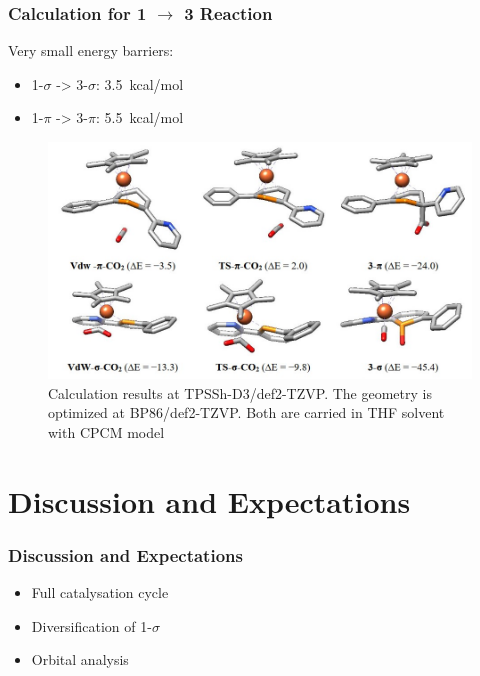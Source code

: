 \documentclass[10pt,aspectratio=43]{beamer}
\numberwithin{equation}{section}
\begin{document}
\begin{frame}
\frametitle{Calculation for 1 $ \rightarrow $ 3 Reaction}
Very small energy barriers:
\begin{itemize}
	\item 1-$ \sigma $ -> 3-$ \sigma $: \SI{3.5}{kcal/mol}
	\item 1-$ \pi $ -> 3-$ \pi $: \SI{5.5}{kcal/mol}
\end{itemize}
\begin{figure}
	\includegraphics[width=0.85\linewidth]{33.jpg}
	\caption{Calculation results at TPSSh-D3/def2-TZVP. The geometry is optimized at BP86/def2-TZVP. Both are carried in THF solvent with CPCM model}
\end{figure}

\end{frame}



\section{Discussion and Expectations}
\begin{frame}
\frametitle{Discussion and Expectations}
\begin{itemize}
	\item Full catalysation cycle
	\item Diversification of 1-$ \sigma $
	\item Orbital analysis
\end{itemize}

\end{frame}

\iffalse
\end{document}
